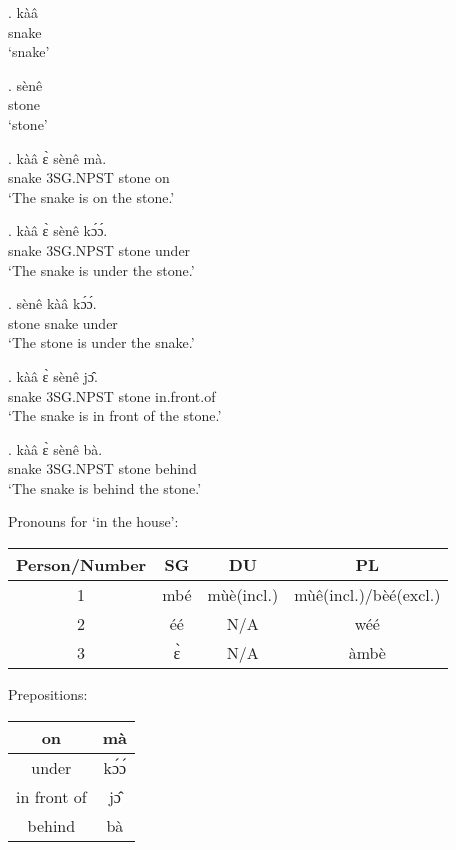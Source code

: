\documentclass{assets/fieldnotes}
\begin{document}
{\exg. kàâ\\
    snake\\
    `snake'

\exg. sènê\\
    stone\\
    `stone'

\exg. kàâ ɛ̀ sènê mà.\\
    snake 3SG.NPST stone on\\
    `The snake is on the stone.'


\exg. kàâ ɛ̀ sènê kɔ́ɔ́.\\
    snake 3SG.NPST stone under\\
    `The snake is under the stone.'

\exg. sènê kàâ kɔ́ɔ́.\\
    stone snake under\\
    `The stone is under the snake.'

\exg. kàâ ɛ̀ sènê jɔ̂.\\
    snake 3SG.NPST stone in.front.of\\
    `The snake is in front of the stone.'

\exg. kàâ ɛ̀ sènê bà.\\
    snake 3SG.NPST stone behind\\
    `The snake is behind the stone.'

Pronouns for `in the house':
\begin{center}
    \begin{tabular}{|c|c|c|c|}
    \hline
    Person/Number & SG & DU & PL \\ \hline
    1 & mbé & mùè(incl.) & mùê(incl.)/bèé(excl.) \\ \hline
    2 & éé & N/A & wéé \\ \hline
    3 & ɛ̀ & N/A & àmbè \\ \hline
    \end{tabular}
\end{center}
Prepositions:
\begin{center}
    \begin{tabular}{|c|c|}
    \hline
    on & mà\\ \hline
    under & kɔ́ɔ́\\ \hline
    in front of & jɔ̂\\ \hline
    behind & bà\\ \hline
    \end{tabular}
\end{center}

}
\end{document}
